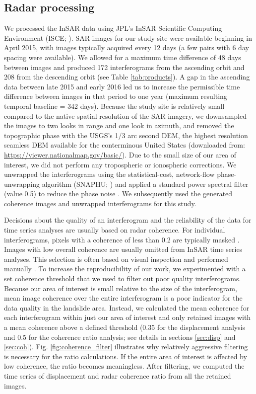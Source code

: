 \documentclass[nhess, manuscript]{copernicus}
\begin{document}
\subsection{Radar processing}
We processed the InSAR data using JPL's InSAR Scientific Computing Environment (ISCE; \cite{rosen2012}). SAR images for our study site were available beginning in April 2015, with images typically acquired every 12 days (a few pairs with 6 day spacing were available). We allowed for a maximum time difference of 48 days between images and produced 172 interferograms from the ascending orbit and 208 from the descending orbit (see Table \ref{tab:products}). A gap in the ascending data between late 2015 and early 2016 led us to increase the permissible time difference between images in that period to one year (maximum resulting temporal baseline = 342 days). Because the study site is relatively small compared to the native spatial resolution of the SAR imagery, we downsampled the images to two looks in range and one look in azimuth, and removed the topographic phase with the USGS's 1/3 arc second DEM, the highest resolution seamless DEM available for the conterminous United States (downloaded from: \url{https://viewer.nationalmap.gov/basic/}). Due to the small size of our area of interest, we did not perform any tropospheric or ionospheric corrections. We unwrapped the interferograms using the statistical-cost, network-flow phase-unwrapping algorithm (SNAPHU; \cite{chen2002}) and applied a standard power spectral filter (value 0.5) to reduce the phase noise \citep{Goldstein1998}. We subsequently used the generated coherence images and unwrapped interferograms for this study.

\par Decisions about the quality of an interferogram and the reliability of the data for time series analyses are usually based on radar coherence. For individual interferograms, pixels with a coherence of less than 0.2 are typically masked \citep[e.g.,][]{rosen2000}. Images with low overall coherence are usually omitted from InSAR time series analyses. This selection is often based on visual inspection and performed manually \citep[e.g.,][]{handwerger2019}. To increase the reproducibility of our work, we experimented with a set coherence threshold that we used to filter out poor quality interferograms. Because our area of interest is small relative to the size of the interferogram, mean image coherence over the entire interferogram is a poor indicator for the data quality in the landslide area. Instead, we calculated the mean coherence for each interferogram within just our area of interest and only retained images with a mean coherence above a defined threshold (0.35 for the displacement analysis and 0.5 for the coherence ratio analysis; see details in sections \ref{sec:disp} and \ref{sec:coh}). Fig. \ref{fig:coherence_filter} illustrates why relatively aggressive filtering is necessary for the ratio calculations. If the entire area of interest is affected by low coherence, the ratio becomes meaningless. After filtering, we computed the time series of displacement and radar coherence ratio from all the retained images. \par 
\end{document}
